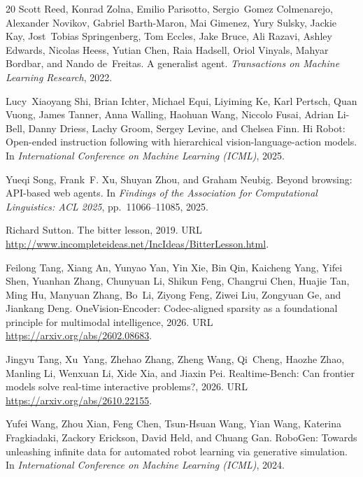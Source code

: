 \documentclass{article}
\begin{document}
\begin{thebibliography}{20}
Scott Reed, Konrad Zolna, Emilio Parisotto, Sergio~Gomez Colmenarejo, Alexander Novikov, Gabriel Barth-Maron, Mai Gimenez, Yury Sulsky, Jackie Kay, Jost~Tobias Springenberg, Tom Eccles, Jake Bruce, Ali Razavi, Ashley Edwards, Nicolas Heess, Yutian Chen, Raia Hadsell, Oriol Vinyals, Mahyar Bordbar, and Nando de~Freitas.
\newblock A generalist agent.
\newblock \emph{Transactions on Machine Learning Research}, 2022.

Lucy~Xiaoyang Shi, Brian Ichter, Michael Equi, Liyiming Ke, Karl Pertsch, Quan Vuong, James Tanner, Anna Walling, Haohuan Wang, Niccolo Fusai, Adrian Li-Bell, Danny Driess, Lachy Groom, Sergey Levine, and Chelsea Finn.
\newblock Hi Robot: Open-ended instruction following with hierarchical vision-language-action models.
\newblock In \emph{International Conference on Machine Learning (ICML)}, 2025.

Yueqi Song, Frank~F. Xu, Shuyan Zhou, and Graham Neubig.
\newblock Beyond browsing: API-based web agents.
\newblock In \emph{Findings of the Association for Computational Linguistics: ACL 2025}, pp.\ 11066--11085, 2025.

Richard Sutton.
\newblock The bitter lesson, 2019.
\newblock URL \url{http://www.incompleteideas.net/IncIdeas/BitterLesson.html}.

Feilong Tang, Xiang An, Yunyao Yan, Yin Xie, Bin Qin, Kaicheng Yang, Yifei Shen, Yuanhan Zhang, Chunyuan Li, Shikun Feng, Changrui Chen, Huajie Tan, Ming Hu, Manyuan Zhang, Bo~Li, Ziyong Feng, Ziwei Liu, Zongyuan Ge, and Jiankang Deng.
\newblock OneVision-Encoder: Codec-aligned sparsity as a foundational principle for multimodal intelligence, 2026.
\newblock URL \url{https://arxiv.org/abs/2602.08683}.

Jingyu Tang, Xu~Yang, Zhehao Zhang, Zheng Wang, Qi~Cheng, Haozhe Zhao, Manling Li, Wenxuan Li, Xide Xia, and Jiaxin Pei.
\newblock Realtime-Bench: Can frontier models solve real-time interactive problems?, 2026.
\newblock URL \url{https://arxiv.org/abs/2610.22155}.

Yufei Wang, Zhou Xian, Feng Chen, Tsun-Hsuan Wang, Yian Wang, Katerina Fragkiadaki, Zackory Erickson, David Held, and Chuang Gan.
\newblock RoboGen: Towards unleashing infinite data for automated robot learning via generative simulation.
\newblock In \emph{International Conference on Machine Learning (ICML)}, 2024.


\end{thebibliography}
\end{document}
